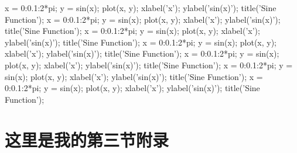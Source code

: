 \documentclass[zihao=-4,UTF8]{article}
\begin{document}
\begin{matlablisting}
x = 0:0.1:2*pi;
y = sin(x);
plot(x, y);
xlabel('x');
ylabel('sin(x)');
title('Sine Function');
x = 0:0.1:2*pi;
y = sin(x);
plot(x, y);
xlabel('x');
ylabel('sin(x)');
title('Sine Function');
x = 0:0.1:2*pi;
y = sin(x);
plot(x, y);
xlabel('x');
ylabel('sin(x)');
title('Sine Function');
x = 0:0.1:2*pi;
y = sin(x);
plot(x, y);
xlabel('x');
ylabel('sin(x)');
title('Sine Function');
x = 0:0.1:2*pi;
y = sin(x);
plot(x, y);
xlabel('x');
ylabel('sin(x)');
title('Sine Function');
x = 0:0.1:2*pi;
y = sin(x);
plot(x, y);
xlabel('x');
ylabel('sin(x)');
title('Sine Function');
x = 0:0.1:2*pi;
y = sin(x);
plot(x, y);
xlabel('x');
ylabel('sin(x)');
title('Sine Function');
\end{matlablisting}

\section{这里是我的第三节附录}
\end{document}
